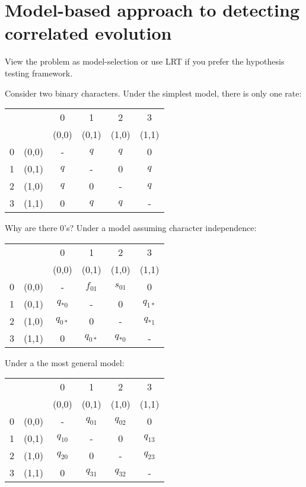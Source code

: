\documentclass[landscape]{foils}
\begin{document}
\myNewSlide


\myNewSlide


\myNewSlide
\section*{Model-based approach to detecting correlated evolution}
View the problem as model-selection or use LRT if you prefer the hypothesis testing framework.

Consider two binary characters. Under the simplest model, there is only one rate:
\begin{table}[htdp]
\begin{center}
\begin{tabular}{lr|c|c|c|c|}
& & 0 & 1 & 2 & 3 \\
& & (0,0) & (0,1) & (1,0) & (1,1) \\
\hline
0 & (0,0) & - & $q$ & $q$ & 0 \\
1 & (0,1) & $q$ & -  & 0 & $q$ \\
2 & (1,0) & $q$ & 0 & - & $q$  \\
3 & (1,1) & 0 & $q$ &  $q$ & - \\
\end{tabular}
\end{center}
\label{default}
\end{table}%

Why are there 0's?
\myNewSlide
Under a model assuming character independence:
\begin{table}[htdp]
\begin{center}
\begin{tabular}{lr|c|c|c|c|}
& & 0 & 1 & 2 & 3 \\
& & (0,0) & (0,1) & (1,0) & (1,1) \\
\hline
0 & (0,0) & - & $f_{01}$ & $s_{01}$ & 0 \\
1 & (0,1) & $q_{\ast0}$ & -  & 0 & $q_{1\ast}$ \\
2 & (1,0) & $q_{0\ast}$ & 0 & - & $q_{\ast1}$  \\
3 & (1,1) & 0 & $q_{0\ast}$ &  $q_{\ast0}$ & - \\
\end{tabular}
\end{center}
\label{default}
\end{table}%
Under a the most general model:
\begin{table}[htdp]
\begin{center}
\begin{tabular}{lr|c|c|c|c|}
& & 0 & 1 & 2 & 3 \\
& & (0,0) & (0,1) & (1,0) & (1,1) \\
\hline
0 & (0,0) & - & $q_{01}$ & $q_{02}$ & 0 \\
1 & (0,1) & $q_{10}$ & -  & 0 & $q_{13}$ \\
2 & (1,0) & $q_{20}$ & 0 & - & $q_{23}$  \\
3 & (1,1) & 0 & $q_{31}$ &  $q_{32}$ & - \\
\end{tabular}
\end{center}
\label{default}
\end{table}%
\end{document}
